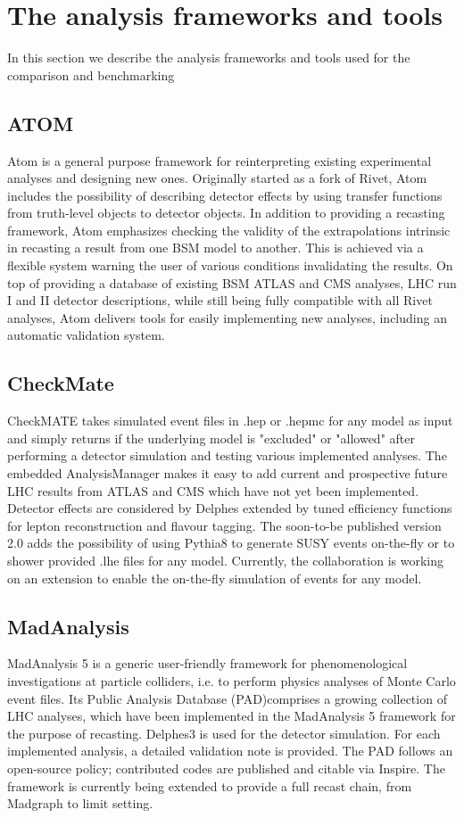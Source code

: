 \documentclass[11pt]{cernrep}
\begin{document}
\section{The analysis frameworks and tools}
In this section we describe the analysis frameworks and tools used for the comparison and benchmarking
\subsection{ATOM}
Atom is a general purpose framework for reinterpreting existing experimental analyses and designing new ones. Originally started as a fork of Rivet, Atom includes the possibility of describing detector effects by using transfer functions from truth-level objects to detector objects. In addition to providing a recasting framework, Atom emphasizes checking the validity of the extrapolations intrinsic in recasting a result from one BSM model to another. This is achieved via a flexible system warning the user of various conditions invalidating the results. On top of providing a database of existing BSM ATLAS and CMS analyses, LHC run I and II detector descriptions, while still being fully compatible with all Rivet analyses, Atom delivers tools for easily implementing new analyses, including an automatic validation system.

\subsection{CheckMate}
CheckMATE takes simulated event files in .hep or .hepmc for any model as input and simply returns if the underlying model is "excluded" or "allowed" after performing a detector simulation and testing various implemented analyses. The embedded AnalysisManager makes it easy to add current and prospective future LHC results from ATLAS and CMS which have not yet been implemented. Detector effects are considered by Delphes extended by tuned efficiency functions for lepton reconstruction and flavour tagging. The soon-to-be published version 2.0 adds the possibility of using Pythia8 to generate SUSY events on-the-fly or to shower provided .lhe files for any model. Currently, the collaboration is working on an extension to enable the on-the-fly simulation of events for any model.


\subsection{MadAnalysis}
MadAnalysis 5 is a generic user-friendly framework for phenomenological investigations at particle colliders, i.e. to perform physics analyses of Monte Carlo event files. Its Public Analysis Database (PAD)comprises a growing collection of LHC analyses, which have been implemented in the MadAnalysis 5 framework for the purpose of recasting. Delphes3 is used for the detector simulation. For each implemented analysis, a detailed validation note is provided. The PAD follows an open-source policy; contributed codes are published and citable via Inspire. The framework is currently being extended to provide a full recast chain, from Madgraph to limit setting.
\end{document}
